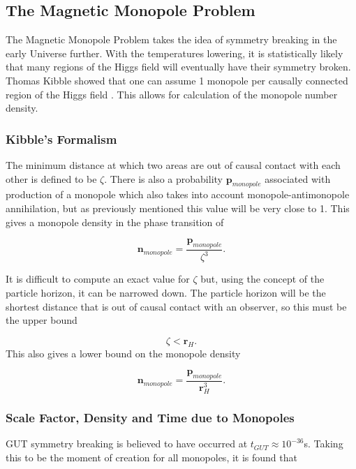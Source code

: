 \documentclass[twocolumn, 10pt]{article}
\begin{document}
\subsection{The Magnetic Monopole Problem}

The Magnetic Monopole Problem takes the idea of symmetry breaking in the early Universe further. With the temperatures lowering, it is statistically likely that many regions of the Higgs field will eventually have their symmetry broken. Thomas Kibble showed that one can assume 1 monopole per causally connected region of the Higgs field \cite{kolb1990early, arrtu2013conf}. This allows for calculation of the monopole number density. 

\subsubsection{Kibble's Formalism}
The minimum distance at which two areas are out of causal contact with each other is defined to be $\zeta$. There is also a probability $\bm{p}_{monopole}$ associated with production of a monopole which also takes into account monopole-antimonopole annihilation, but as previously mentioned this value will be very close to 1. This gives a monopole density in the phase transition of \cite{preskill1984magnetic}

\begin{equation}
\bm{n}_{monopole} = \frac{\bm{p}_{monopole}}{\zeta^{3}}.
\end{equation}

It is difficult to compute an exact value for $\zeta$ but, using the concept of the particle horizon, it can be narrowed down. The particle horizon will be the shortest distance that is out of causal contact with an observer, so this must be the upper bound

\begin{equation}
\zeta < \bm{r}_H.
\end{equation}
This also gives a lower bound on the monopole density

\begin{equation}
\bm{n}_{monopole} = \frac{\bm{p}_{monopole}}{\bm{r}_H^3}.
\end{equation}
\subsubsection{Scale Factor, Density and Time due to Monopoles}
GUT symmetry breaking is believed to have occurred at $t_{GUT}\approx10^{-36}$s. Taking this to be the moment of creation for all monopoles, it is found that
\end{document}
